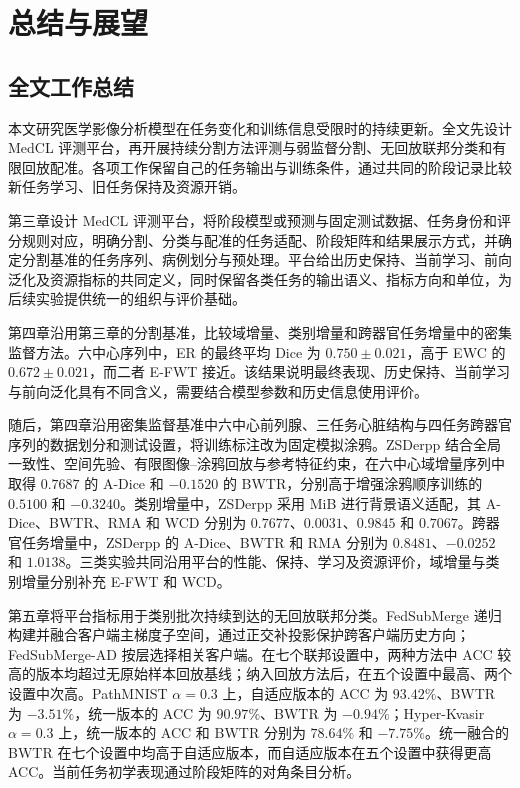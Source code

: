 \chapter{总结与展望}
\label{chap:conclusion}

\section{全文工作总结}
\label{sec:conclusion-summary}

本文研究医学影像分析模型在任务变化和训练信息受限时的持续更新。全文先设计 MedCL 评测平台，再开展持续分割方法评测与弱监督分割、无回放联邦分类和有限回放配准。各项工作保留自己的任务输出与训练条件，通过共同的阶段记录比较新任务学习、旧任务保持及资源开销。

第三章设计 MedCL 评测平台，将阶段模型或预测与固定测试数据、任务身份和评分规则对应，明确分割、分类与配准的任务适配、阶段矩阵和结果展示方式，并确定分割基准的任务序列、病例划分与预处理。平台给出历史保持、当前学习、前向泛化及资源指标的共同定义，同时保留各类任务的输出语义、指标方向和单位，为后续实验提供统一的组织与评价基础。

第四章沿用第三章的分割基准，比较域增量、类别增量和跨器官任务增量中的密集监督方法。六中心序列中，ER 的最终平均 Dice 为 $0.750\pm0.021$，高于 EWC 的 $0.672\pm0.021$，而二者 E-FWT 接近。该结果说明最终表现、历史保持、当前学习与前向泛化具有不同含义，需要结合模型参数和历史信息使用评价。

随后，第四章沿用密集监督基准中六中心前列腺、三任务心脏结构与四任务跨器官序列的数据划分和测试设置，将训练标注改为固定模拟涂鸦。ZSDerpp 结合全局一致性、空间先验、有限图像--涂鸦回放与参考特征约束，在六中心域增量序列中取得 $0.7687$ 的 A-Dice 和 $-0.1520$ 的 BWTR，分别高于增强涂鸦顺序训练的 $0.5100$ 和 $-0.3240$。类别增量中，ZSDerpp 采用 MiB 进行背景语义适配，其 A-Dice、BWTR、RMA 和 WCD 分别为 $0.7677$、$0.0031$、$0.9845$ 和 $0.7067$。跨器官任务增量中，ZSDerpp 的 A-Dice、BWTR 和 RMA 分别为 $0.8481$、$-0.0252$ 和 $1.0138$。三类实验共同沿用平台的性能、保持、学习及资源评价，域增量与类别增量分别补充 E-FWT 和 WCD。

第五章将平台指标用于类别批次持续到达的无回放联邦分类。FedSubMerge 递归构建并融合客户端主梯度子空间，通过正交补投影保护跨客户端历史方向；FedSubMerge-AD 按层选择相关客户端。在七个联邦设置中，两种方法中 ACC 较高的版本均超过无原始样本回放基线；纳入回放方法后，在五个设置中最高、两个设置中次高。PathMNIST $\alpha=0.3$ 上，自适应版本的 ACC 为 $93.42\%$、BWTR 为 $-3.51\%$，统一版本的 ACC 为 $90.97\%$、BWTR 为 $-0.94\%$；Hyper-Kvasir $\alpha=0.3$ 上，统一版本的 ACC 和 BWTR 分别为 $78.64\%$ 和 $-7.75\%$。统一融合的 BWTR 在七个设置中均高于自适应版本，而自适应版本在五个设置中获得更高 ACC。当前任务初学表现通过阶段矩阵的对角条目分析。

